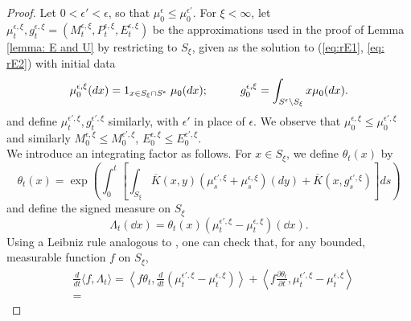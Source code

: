 \begin{proof} Let $0<\epsilon'<\epsilon$, so that $\mu_0^\epsilon\le\mu_0^{\epsilon'}.$ For $\xi<\infty$, let $\mu^{\epsilon, \xi}_t, g^{\epsilon, \xi}_t=(M^{\epsilon,\xi}_t,P^{\epsilon,\xi}_t,E^{\epsilon,\xi}_t)$ be the approximations used in the proof of Lemma \ref{lemma: E and U} by restricting to $S_\xi$, given as the solution to (\ref{eq:rE1}, \ref{eq: rE2}) with initial data
\begin{equation} \mu^{\epsilon,\xi}_0(dx)=1_{x\in S_\xi \cap S^\epsilon}\hspace{0.1cm}\mu_0(dx);\hspace{1cm} g^{\epsilon,\xi}_0=\int_{S^\epsilon\setminus S_\xi}x\mu_0(dx).\end{equation}
and define $\mu^{\epsilon',\xi}_t, g^{\epsilon',\xi}_t$ similarly, with $\epsilon'$ in place of $\epsilon$. We observe that $\mu^{\epsilon,\xi}_0\le \mu^{\epsilon',\xi}_0$ and similarly $M^{\epsilon,\xi}_0\le M^{\epsilon',\xi}_0$, $E^{\epsilon,\xi}_0\le E^{\epsilon',\xi}_0$. \medskip \\ 
We introduce an integrating factor as follows. For $x\in S_\xi$, we define $\theta_t(x)$ by 
\begin{equation} \theta_t(x)=\exp\left( \int_0^t\left[\int_{S_\xi}\overline{K}(x,y) (\mu^{\epsilon',\xi}_s+\mu^{\epsilon,\xi}_s)(d y)+\overline{K}\left(x,g^{\epsilon',\xi}_s\right)\right]ds\right)
\end{equation}
and define the signed measure on $S_\xi$ \begin{equation}
    \Lambda_t(\dd x) = \theta_t(x) \left(\mu^{\epsilon',\xi}_t - \mu^{\epsilon,\xi}_t\right)(\dd x).
\end{equation} Using a Leibniz rule analogous to \cite[Proposition 2.5]{N00}, one can check that, for any bounded, measurable function $f$ on $S_\xi$, \begin{equation} \label{eq: ODE for xit} \begin{split} &\frac{d}{dt}\langle f, \Lambda_t\rangle = \left\langle f \theta_t, \frac{d}{dt}(\mu^{\epsilon',\xi}_t-\mu^{\epsilon, \xi}_t)\right\rangle +\left\langle f\frac{\partial \theta_t}{\partial t},\mu^{\epsilon',\xi}_t-\mu^{\epsilon, \xi}_t  \right\rangle \\[1ex]& = %

\end{split}
\end{equation}
\end{proof}
